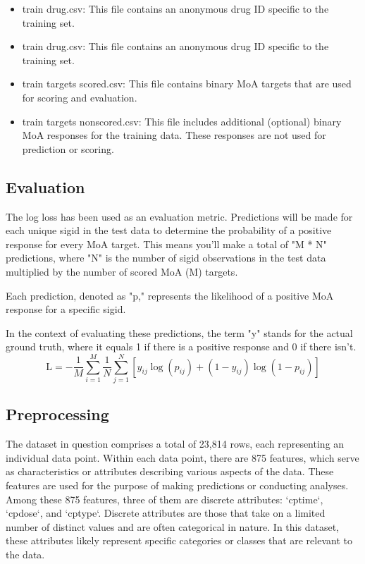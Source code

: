\documentclass{article}
\begin{document}
\begin{multicols}{2}
\begin{itemize}
    \item train drug.csv: This file contains an anonymous drug ID specific to the training set.

    \item train drug.csv: This file contains an anonymous drug ID specific to the training set.

    \item train targets scored.csv: This file contains binary MoA targets that are used for scoring and evaluation.

    \item train targets nonscored.csv: This file includes additional (optional) binary MoA responses for the training data. These responses are not used for prediction or scoring.

\end{itemize}
\subsection{Evaluation}
The log loss has been used as an evaluation metric. Predictions will be made for each unique sigid in the test data to determine the probability of a positive response for every MoA target. This means you'll make a total of "M * N" predictions, where "N" is the number of sigid observations in the test data multiplied by the number of scored MoA (M) targets.

Each prediction, denoted as "p," represents the likelihood of a positive MoA response for a specific sigid.

In the context of evaluating these predictions, the term "y" stands for the actual ground truth, where it equals 1 if there is a positive response and 0 if there isn't.
\[
\text{L} = -\frac{1}{M} \sum_{i=1}^{M} \frac{1}{N} \sum_{j=1}^{N} \left[y_{ij} \log(p_{ij})
 + (1 - y_{ij}) \log(1 - p_{ij})\right]
\]
\subsection{Preprocessing}
The dataset in question comprises a total of 23,814 rows, each representing an individual data point. Within each data point, there are 875 features, which serve as characteristics or attributes describing various aspects of the data. These features are used for the purpose of making predictions or conducting analyses.\\

Among these 875 features, three of them are discrete attributes: `cptime`, `cpdose`, and `cptype`. Discrete attributes are those that take on a limited number of distinct values and are often categorical in nature. In this dataset, these attributes likely represent specific categories or classes that are relevant to the data.\\


\end{multicols}
\end{document}
